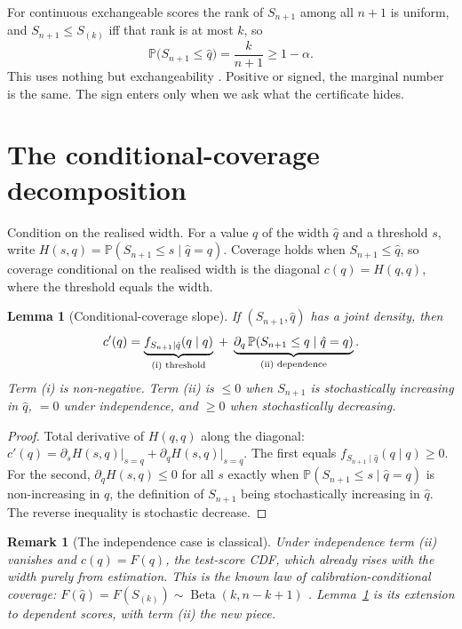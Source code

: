 \documentclass[11pt]{article}
\newtheorem{lemma}{Lemma}
\newtheorem{remark}{Remark}
\begin{document}
For continuous exchangeable scores the rank of $S_{n+1}$ among all $n+1$ is uniform, and
$S_{n+1}\le S_{(k)}$ iff that rank is at most $k$, so
\begin{equation}
\mathbb P\big(S_{n+1}\le\hat q\big)=\frac{k}{n+1}\ge 1-\alpha .
\end{equation}
This uses nothing but exchangeability \citep{vovk2005}. Positive or signed, the marginal
number is the same. The sign enters only when we ask what the certificate hides.

\section{The conditional-coverage decomposition}

Condition on the realised width. For a value $q$ of the width $\hat q$ and a threshold $s$, write
$H(s,q)=\mathbb P(S_{n+1}\le s\mid\hat q=q)$. Coverage holds when $S_{n+1}\le\hat q$, so coverage
conditional on the realised width is the diagonal $c(q)=H(q,q)$, where the threshold equals the
width.

\begin{lemma}[Conditional-coverage slope]\label{lem:slope}
If $(S_{n+1},\hat q)$ has a joint density, then
\begin{equation}
c'(q)=\underbrace{f_{S_{n+1}\mid\hat q}(q\mid q)}_{\textup{(i) threshold}}
\;+\;\underbrace{\partial_q\,\mathbb P(S_{n+1}\le q\mid\hat q=q)}_{\textup{(ii) dependence}} .
\end{equation}
Term \textup{(i)} is non-negative. Term \textup{(ii)} is $\le 0$ when $S_{n+1}$ is
stochastically increasing in $\hat q$, $=0$ under independence, and $\ge 0$ when stochastically
decreasing.
\end{lemma}

\begin{proof}
Total derivative of $H(q,q)$ along the diagonal: $c'(q)=\partial_s H(s,q)\big|_{s=q}+\partial_q
H(s,q)\big|_{s=q}$. The first equals $f_{S_{n+1}\mid\hat q}(q\mid q)\ge 0$. For the second,
$\partial_q H(s,q)\le 0$ for all $s$ exactly when $\mathbb P(S_{n+1}\le s\mid\hat q=q)$ is
non-increasing in $q$, the definition of $S_{n+1}$ being stochastically increasing in
$\hat q$. The reverse inequality is stochastic decrease.
\end{proof}

\begin{remark}[The independence case is classical]
Under independence term (ii) vanishes and $c(q)=F(q)$, the test-score CDF, which already rises
with the width purely from estimation. This is the known law of calibration-conditional
coverage: $F(\hat q)=F(S_{(k)})\sim\operatorname{Beta}(k,n-k+1)$
\citep{vovk2012,marques2024,angelopoulos2023gentle}. Lemma~\ref{lem:slope} is its extension to
dependent scores, with term (ii) the new piece.
\end{remark}
\end{document}
